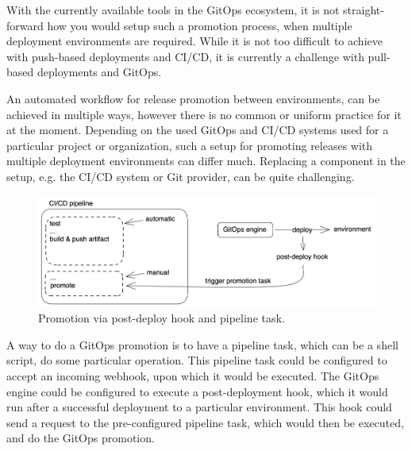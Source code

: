 With the currently available tools in the GitOps ecosystem,
it is not straight-forward how you would setup such a promotion process,
when multiple deployment environments are required.
While it is not too difficult to achieve with push-based deployments and CI/CD,
it is currently a challenge with pull-based deployments and GitOps.


An automated workflow for release promotion between environments,
can be achieved in multiple ways,
however there is no common or uniform practice for it at the moment.
Depending on the used GitOps and CI/CD systems used for a particular project or organization,
such a setup for promoting releases with multiple deployment environments can differ much.
Replacing a component in the setup, e.g. the CI/CD system or Git provider, can be quite challenging.

\begin{figure}[h]
	\centering
	\includegraphics[width=0.99\linewidth]{assets/promotion-by-pipeline-task-post-deploy-hook.png}
	\caption{Promotion via post-deploy hook and pipeline task.
	}
	\label{fig:promotion-by-pipeline-task-post-deploy-hook}	
\end{figure}

A way to do a GitOps promotion is to have a pipeline task, which can be a shell script,
do some particular operation. This pipeline task could be configured to accept an incoming webhook,
upon which it would be executed.
The GitOps engine could be configured to execute a post-deployment hook,
which it would run after a successful deployment to a particular environment.
This hook could send a request to the pre-configured pipeline task, which would then be executed,
and do the GitOps promotion.












